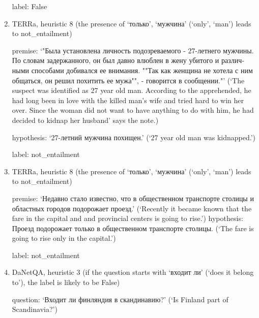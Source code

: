 \documentclass[11pt]{article}
\begin{document}
\begin{enumerate}
label: False

\item TERRa, heuristic 8 (the presence of \foreignlanguage{russian}{`только', `мужчина'} (`only', `man') leads to not\_entailment)

premise: \foreignlanguage{russian}{`"Была установлена личность подозреваемого - 27-летнего мужчины. По словам задержанного, он был давно влюблен в жену убитого и различными способами добивался ее внимания. ""Так как женщина не хотела с ним общаться, он решил похитить ее мужа"", - говорится в сообщении."'} (`The suspect was identified as 27 year old man. According to the apprehended, he had long been in love with the killed man's wife and tried hard to win her over. Since the woman did not want to have anything to do with him, he had decided to kidnap her husband' says the note.)

hypothesis: \foreignlanguage{russian}{`27-летний мужчина похищен.'} (`27 year old man was kidnapped.')

label: not\_entailment

\item TERRa, heuristic 8 (the presence of \foreignlanguage{russian}{`только', `мужчина'} (`only', `man') leads to not\_entailment)

premise: \foreignlanguage{russian}{`Недавно стало известно, что в общественном транспорте столицы и областных городов подорожает проезд.'} (`Recently it became known that the fare in the capital and and provincial centers is going to rise.')
hypothesis: \foreignlanguage{russian}{Проезд подорожает только в общественном транспорте столицы.} (`The fare is going to rise only in the capital.')

label: not\_entailment

\item DaNetQA, heuristic 3 (if the question starts with \foreignlanguage{russian}{`входит ли'} (`does it belong to'), the label is likely to be False)

question: \foreignlanguage{russian}{`Входит ли финляндия в скандинавию?'} (`Is Finland part of Scandinavia?')


\end{enumerate}
\end{document}

